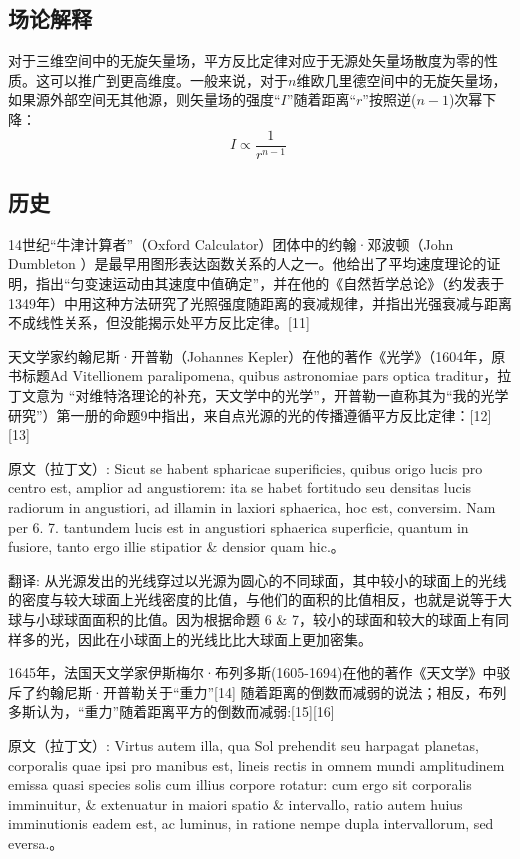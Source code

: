 \subsection{场论解释}
对于三维空间中的无旋矢量场，平方反比定律对应于无源处矢量场散度为零的性质。这可以推广到更高维度。一般来说，对于$n$维欧几里德空间中的无旋矢量场，如果源外部空间无其他源，则矢量场的强度“$I$”随着距离“$r$”按照逆($n-1$)次幂下降：
\begin{equation}
I \propto \frac{1}{r^{n-1}}~
\end{equation}

\subsection{历史}
14世纪“牛津计算者”（Oxford Calculator）团体中的约翰·邓波顿（John Dumbleton ）是最早用图形表达函数关系的人之一。他给出了平均速度理论的证明，指出“匀变速运动由其速度中值确定”，并在他的《自然哲学总论》（约发表于1349年）中用这种方法研究了光照强度随距离的衰减规律，并指出光强衰减与距离不成线性关系，但没能揭示处平方反比定律。[11]

天文学家约翰尼斯·开普勒（Johannes Kepler）在他的著作《光学》（1604年，原书标题Ad Vitellionem paralipomena, quibus astronomiae pars optica traditur，拉丁文意为 “对维特洛理论的补充，天文学中的光学”，开普勒一直称其为“我的光学研究”）第一册的命题9中指出，来自点光源的光的传播遵循平方反比定律：[12][13]

原文（拉丁文）: Sicut se habent spharicae superificies, quibus origo lucis pro centro est, amplior ad angustiorem: ita se habet fortitudo seu densitas lucis radiorum in angustiori, ad illamin in laxiori sphaerica, hoc est, conversim. Nam per 6. 7. tantundem lucis est in angustiori sphaerica superficie, quantum in fusiore, tanto ergo illie stipatior & densior quam hic.。

翻译: 从光源发出的光线穿过以光源为圆心的不同球面，其中较小的球面上的光线的密度与较大球面上光线密度的比值，与他们的面积的比值相反，也就是说等于大球与小球球面面积的比值。因为根据命题 6 & 7，较小的球面和较大的球面上有同样多的光，因此在小球面上的光线比比大球面上更加密集。

1645年，法国天文学家伊斯梅尔·布列多斯(1605-1694)在他的著作《天文学》中驳斥了约翰尼斯·开普勒关于“重力”[14] 随着距离的倒数而减弱的说法；相反，布列多斯认为，“重力”随着距离平方的倒数而减弱:[15][16]

原文（拉丁文）: Virtus autem illa, qua Sol prehendit seu harpagat planetas, corporalis quae ipsi pro manibus est, lineis rectis in omnem mundi amplitudinem emissa quasi species solis cum illius corpore rotatur: cum ergo sit corporalis imminuitur, & extenuatur in maiori spatio & intervallo, ratio autem huius imminutionis eadem est, ac luminus, in ratione nempe dupla intervallorum, sed eversa.。

